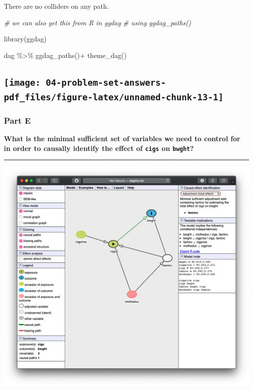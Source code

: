 \documentclass[
]{article}
\newenvironment{Shaded}{\begin{snugshade}}{\end{snugshade}}
\newcommand{\CommentTok}[1]{\textcolor[rgb]{0.56,0.35,0.01}{\textit{#1}}}
\newcommand{\FunctionTok}[1]{\textcolor[rgb]{0.00,0.00,0.00}{#1}}
\newcommand{\NormalTok}[1]{#1}
\newcommand{\SpecialCharTok}[1]{\textcolor[rgb]{0.00,0.00,0.00}{#1}}
\begin{document}
There are no colliders on any path.

\begin{Shaded}
\begin{Highlighting}[]
\CommentTok{\# we can also get this from R in ggdag}
\CommentTok{\# using ggdag\_paths()}

\FunctionTok{library}\NormalTok{(ggdag)}

\NormalTok{dag }\SpecialCharTok{\%\textgreater{}\%}
  \FunctionTok{ggdag\_paths}\NormalTok{()}\SpecialCharTok{+}
  \FunctionTok{theme\_dag}\NormalTok{()}
\end{Highlighting}
\end{Shaded}

\hypertarget{section}{%
\subsection{\texorpdfstring{\texttt{[image: 04-problem-set-answers-pdf\_files/figure-latex/unnamed-chunk-13-1]}}{}}\label{section}}

\hypertarget{part-e}{%
\subsubsection{Part E}\label{part-e}}

\textbf{What is the minimal sufficient set of variables we need to
control for in order to causally identify the effect of \texttt{cigs} on
\texttt{bwght}?}

\begin{center}\rule{0.5\linewidth}{0.5pt}\end{center}

\includegraphics{../images/7dagitty.png}
\end{document}
